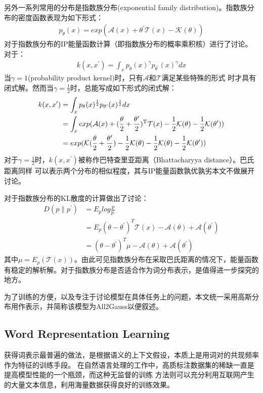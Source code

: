 \documentclass[13pt]{article}
\begin{document}
另外一系列常用的分布是指数族分布(exponential family distribution)。指数族分布的密度函数表现为如下形式：
\begin{align*}
p_{\theta}(x)=exp(\mathcal{A}(x)+\theta^{\prime{}}\mathcal{T}(x)-\mathcal{K}(\theta))
\end{align*}
\cite{jebara2004probability}对于指数族分布的IP能量函数计算（即指数族分布的概率乘积核）进行了讨论。对于：
\begin{align*}
k(x,x^{\prime{}})=\int_x p_\theta(x)^{\gamma} p_{\theta^{\prime{}}}(x)^{\gamma}dx
\end{align*}
当$\gamma=1$(probability product kernel)时，只有$\mathcal{A}$和$\mathcal{T}$满足某些特殊的形式
时才具有闭式解。然而当$\gamma=\frac{1}{2}$时，总能写成如下形式的闭式解：
\begin{align*}
k(x,x^{\prime{}})&=\int_x p_\theta(x)^{\frac{1}{2}} p_{\theta^{\prime{}}}(x)^{\frac{1}{2}}dx \\
&=\int_x exp(\mathcal{A}(x)+(\frac{\theta}{2}+\frac{\theta^{\prime{}}}{2})^{\rm T}\mathcal{T}(x)-\frac{1}{2}\mathcal{K}(\theta)-\frac{1}{2}\mathcal{K}(\theta^{\prime{}})) \\
&=exp(\mathcal{K}(\frac{\theta}{2}+\frac{\theta^{\prime{}}}{2})-\frac{1}{2}\mathcal{K}(\theta)-\frac{1}{2}\mathcal{K}(\theta)-\frac{1}{2}\mathcal{K}(\theta^{\prime{}})) 
\end{align*}
对于$\gamma=\frac{1}{2}$时，$k(x,x^{\prime{}})$被称作巴特查里亚距离（Bhattacharyya distance）。巴氏距离同样
可以表示两个分布的相似程度，其与IP能量函数孰优孰劣本文不做展开讨论。

\cite{jordan2003introduction}对于指数族分布的KL散度的计算做出了讨论：
\begin{align*}
D(p \parallel p^{\prime{}}) &= E_p log \frac{p}{p_{\prime{}}} \\
&=E_p (\theta - \theta^{\prime{}})^{T} \mathcal{T}(x) - \mathcal{A}(\theta) + \mathcal{A}(\theta^{\prime{}}) \\
&= (\theta - \theta^{\prime{}})^{T} \mu - \mathcal{A}(\theta) + \mathcal{A}(\theta^{\prime{}})
\end{align*}
其中$\mu = E_p (\mathcal{T}(x))$。由此可见指数族分布在采取巴氏距离的情况下，能量函数有稳定的解析解。对于指数族分布是否适合作为词分布表示，是值得进一步探究的地方。

为了训练的方便，以及专注于讨论模型在具体任务上的问题，本文统一采用高斯分布用作表示，并简称该模型为All2Gauss以便叙述。

\subsection{Word Representation Learning}
获得词表示最普遍的做法，是根据语义的上下文假设，本质上是用词对的共现频率作为特征的训练手段。
在自然语言处理的工作中，高质标注数据集的稀缺一直是提高模型性能的一个瓶颈，而这种无监督的训练
方法则可以充分利用互联网产生的大量文本信息，利用海量数据获得良好的训练效果。
\end{document}
